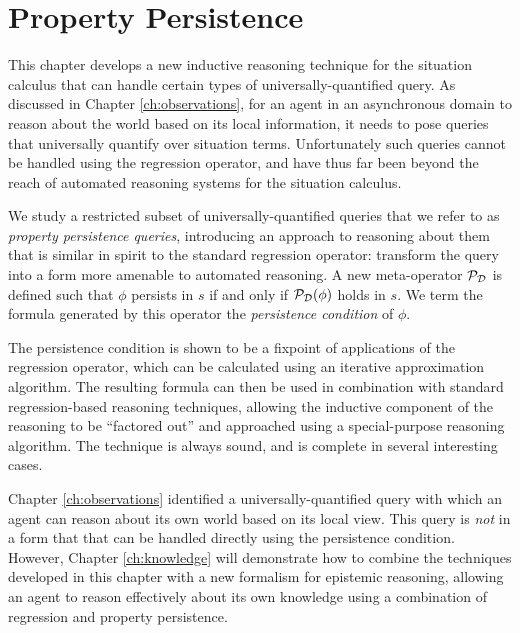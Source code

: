 

\chapter{Property Persistence}

\label{ch:persistence}

This chapter develops a new inductive reasoning technique for the
situation calculus that can handle certain types of universally-quantified
query. As discussed in Chapter \ref{ch:observations}, for an agent
in an asynchronous domain to reason about the world based on its local
information, it needs to pose queries that universally quantify over
situation terms. Unfortunately such queries cannot be handled using
the regression operator, and have thus far been beyond the reach of
automated reasoning systems for the situation calculus.

We study a restricted subset of universally-quantified queries that
we refer to as \emph{property persistence queries}, introducing an
approach to reasoning about them that is similar in spirit to the
standard regression operator: transform the query into a form more
amenable to automated reasoning. A new meta-operator $\mathcal{P}_{\mathcal{D}}$
is defined such that $\phi$ persists in $s$ if and only if $\mathcal{P}_{\mathcal{D}}(\phi)$
holds in $s$. We term the formula generated by this operator the
\emph{persistence condition} of $\phi$.

The persistence condition is shown to be a fixpoint of applications
of the regression operator, which can be calculated using an iterative
approximation algorithm. The resulting formula can then be used in
combination with standard regression-based reasoning techniques, allowing
the inductive component of the reasoning to be {}``factored out''
and approached using a special-purpose reasoning algorithm. The technique
is always sound, and is complete in several interesting cases.

Chapter \ref{ch:observations} identified a universally-quantified
query with which an agent can reason about its own world based on
its local view. This query is \emph{not} in a form that that can be
handled directly using the persistence condition. However, Chapter
\ref{ch:knowledge} will demonstrate how to combine the techniques
developed in this chapter with a new formalism for epistemic reasoning,
allowing an agent to reason effectively about its own knowledge using
a combination of regression and property persistence.

